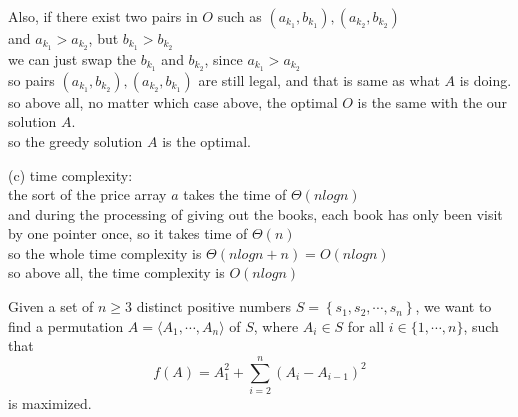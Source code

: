 \begin{solution}
Also, if there exist two pairs in $O$ such as $(a_{k_1},b_{k_1}),(a_{k_2},b_{k_2})$\\
and $a_{k_1}>a_{k_2}$, but $b_{k_1}>b_{k_2}$\\
we can just swap the $b_{k_1}$ and $b_{k_2}$, since $a_{k_1}>a_{k_2}$\\
so pairs $(a_{k_1},b_{k_2}),(a_{k_2},b_{k_1})$ are still legal, and that is same as what $A$ is doing.\\

so above all, no matter which case above, the optimal $O$ is the same with the our solution $A$.\\
so the greedy solution $A$ is the optimal.

(c) time complexity:\\
the sort of the price array $a$ takes the time of $\Theta(nlogn)$\\
and during the processing of giving out the books, each book has only been visit by one pointer once, so it takes time of $\Theta(n)$\\
so the whole time complexity is $\Theta(nlogn + n) = O(nlogn)$\\
so above all, the time complexity is $O(nlogn)$
\end{solution}

\newpage

\titledquestion{} Given a set of \(n\geqslant 3\) distinct positive numbers \(S=\left\{s_1,s_2,\cdots,s_n\right\}\), we want to find a permutation \(A=\langle A_1,\cdots,A_n\rangle\) of \(S\), where \(A_i\in S\) for all \(i\in\{1,\cdots,n\}\), such that
\[f(A)=A_1^2+\sum_{i=2}^n\left(A_i-A_{i-1}\right)^2\]
is maximized.

